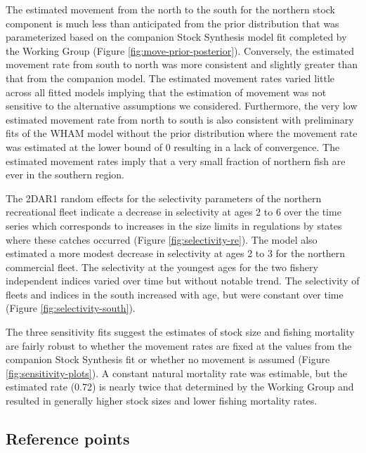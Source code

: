 \documentclass[
]{article}
\begin{document}
The estimated movement from the north to the south for the northern stock component is much less than anticipated from the prior distribution that was parameterized based on the companion Stock Synthesis model fit completed by the Working Group (Figure \ref{fig:move-prior-posterior}). Conversely, the estimated movement rate from south to north was more consistent and slightly greater than that from the companion model. The estimated movement rates varied little across all fitted models implying that the estimation of movement was not sensitive to the alternative assumptions we considered. Furthermore, the very low estimated movement rate from north to south is also consistent with preliminary fits of the WHAM model without the prior distribution where the movement rate was estimated at the lower bound of 0 resulting in a lack of convergence. The estimated movement rates imply that a very small fraction of northern fish are ever in the southern region.

The 2DAR1 random effects for the selectivity parameters of the northern recreational fleet indicate a decrease in selectivity at ages 2 to 6 over the time series which corresponds to increases in the size limits in regulations by states where these catches occurred (Figure \ref{fig:selectivity-re}). The model also estimated a more modest decrease in selectivity at ages 2 to 3 for the northern commercial fleet. The selectivity at the youngest ages for the two fishery independent indices varied over time but without notable trend. The selectivity of fleets and indices in the south increased with age, but were constant over time (Figure \ref{fig:selectivity-south}).

The three sensitivity fits suggest the estimates of stock size and fishing mortality are fairly robust to whether the movement rates are fixed at the values from the companion Stock Synthesis fit or whether no movement is assumed (Figure \ref{fig:sensitivity-plots}). A constant natural mortality rate was estimable, but the estimated rate (0.72) is nearly twice that determined by the Working Group and resulted in generally higher stock sizes and lower fishing mortality rates.

\hypertarget{reference-points-1}{%
\subsection*{Reference points}\label{reference-points-1}}
\end{document}
